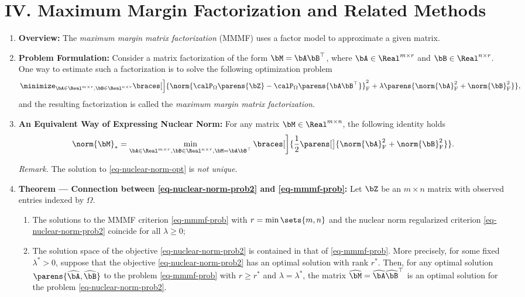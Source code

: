 \documentclass[12pt]{article}
\begin{document}
\section*{IV. Maximum Margin Factorization and Related Methods}

\begin{enumerate}[label=\textbf{\arabic*.}]

	\item \textbf{Overview:} The \emph{maximum margin matrix factorization} (MMMF) uses a factor model to approximate a given matrix. 
	
	\item \textbf{Problem Formulation:} Consider a matrix factorization of the form $\bM = \bA \bB^\top$, where $\bA \in \Real^{m \times r}$ and $\bB \in \Real^{n \times r}$. One way to estimate such a factorization is to solve the following optimization problem 
	\begin{align}\label{eq-mmmf-prob}
		\minimize_{\bA \in \Real^{m \times r}, \bB \in \Real^{n \times r}} \braces[\Big]{\norm{\calP_{\Omega} \parens{\bZ} - \calP_{\Omega} \parens{\bA \bB^\top}}_{\mathrm{F}}^2 + \lambda \parens{\norm{\bA}_{\mathrm{F}}^2 + \norm{\bB}_{\mathrm{F}}^2}}, 
	\end{align}
	and the resulting factorization is called the \emph{maximum margin matrix factorization}. 
	
	\item \textbf{An Equivalent Way of Expressing Nuclear Norm:} For any matrix $\bM \in \Real^{m \times n}$, the following identity holds 
	\begin{align}\label{eq-nuclear-norm-opt}
		\norm{\bM}_* = \min_{\bA \in \Real^{m \times r}, \bB \in \Real^{n \times r}, \bM = \bA \bB^\top} \braces[\bigg]{\frac{1}{2} \parens[\big]{\norm{\bA}_{\mathrm{F}}^2 + \norm{\bB}_{\mathrm{F}}^2}}. 
	\end{align}
	
	\textit{Remark.} The solution to \eqref{eq-nuclear-norm-opt} is \emph{not unique}. 
	
	\item \textbf{Theorem --- Connection between \eqref{eq-nuclear-norm-prob2} and \eqref{eq-mmmf-prob}:} Let $\bZ$ be an $m \times n$ matrix with observed entries indexed by $\Omega$. 
	\begin{enumerate}
		\item The solutions to the MMMF criterion \eqref{eq-mmmf-prob} with $r = \min \sets{m, n}$ and the nuclear norm regularized criterion \eqref{eq-nuclear-norm-prob2} coincide for all $\lambda \ge 0$; 
		\item The solution space of the objective \eqref{eq-nuclear-norm-prob2} is contained in that of \eqref{eq-mmmf-prob}. More precisely, for some fixed $\lambda^* > 0$, suppose that the objective \eqref{eq-nuclear-norm-prob2} has an optimal solution with rank $r^*$. Then, for any optimal solution $\parens{\widehat{\bA}, \widehat{\bB}}$ to the problem \eqref{eq-mmmf-prob} with $r \ge r^*$ and $\lambda = \lambda^*$, the matrix $\widehat{\bM} = \widehat{\bA} \widehat{\bB}^\top$ is an optimal solution for the problem \eqref{eq-nuclear-norm-prob2}. 
	\end{enumerate}
	

\end{enumerate}
\end{document}
